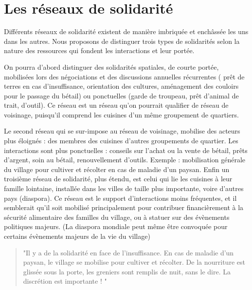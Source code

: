 \section{Les réseaux de solidarité}

%
%
%

Différents réseaux de solidarité existent de manière imbriquée et enchâssée les uns dans les autres. Nous proposons de distinguer trois types de solidarités selon la nature des ressources qui fondent les interactions et leur portée.

On pourra d'abord distinguer des solidarités spatiales, de courte portée,  mobilisées lors des négociations et des discussions annuelles récurrentes ( prêt de terres en cas d'insuffisance, orientation des cultures, aménagement des couloirs pour le passage du bétail) ou ponctuelles (garde de troupeau, prêt d'animal de trait, d'outil).
Ce réseau est un réseau qu'on pourrait qualifier de réseau de voisinage, puisqu'il comprend les cuisines d'un même groupement de quartiers.

Le second réseau qui se sur-impose au réseau de voisinage, mobilise des acteurs plus éloignés : des membres des cuisines d'autres groupements de quartier.
Les interactions sont plus ponctuelles : conseils sur l'achat ou la vente de bétail, prêts d'argent, soin au bétail, renouvellement d'outils. Exemple : mobilisation générale du village pour cultiver et récolter en cas de maladie d'un paysan.
Enfin un troisième réseau de solidarité, plus étendu, est celui qui lie les cuisines à leur famille lointaine, installée dans les villes de taille plus importante, voire d'autres pays (diaspora).
Ce réseau est le support d'interactions  moins fréquentes, et il semblerait qu'il soit mobilisé principalement pour contribuer financièrement à la sécurité alimentaire des familles du village, ou à statuer sur des évènements politiques majeurs. (La diaspora mondiale peut même être convoquée pour certains évènements majeurs de la vie du village)

\begin{quote}
  "Il y a de la solidarité en face de l’insuffisance. En cas de maladie d’un paysan, le village se mobilise pour cultiver et récolter. De la nourriture est glissée sous la porte, les greniers sont remplis de nuit, sans le dire. La discrétion est importante ! "
\end{quote}
